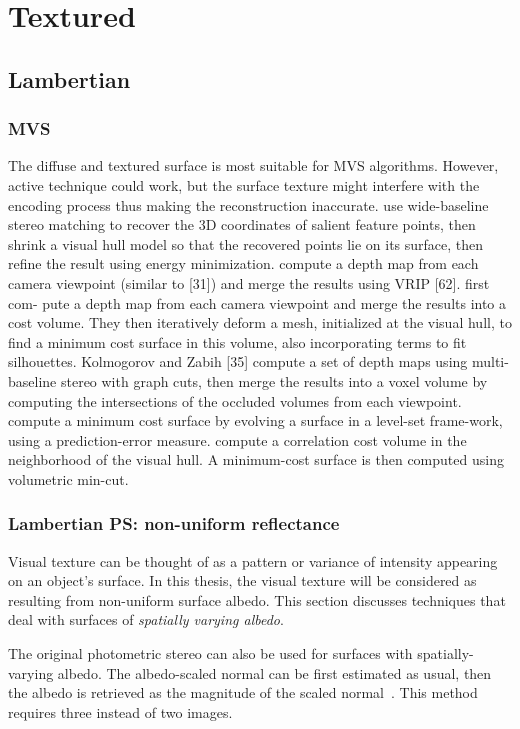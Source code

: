 \section{Textured}
\subsection{Lambertian}
\subsubsection{MVS}
The diffuse and textured surface is most suitable for MVS algorithms. However, active technique could work, but the surface texture might interfere with the encoding process thus making the reconstruction inaccurate. \citeauthor{furukawa2008high} use wide-baseline stereo matching to recover the 3D coordinates of salient feature points, then shrink a visual hull model so that the recovered points lie on its surface, then refine the result using energy minimization. \citeauthor{goesele2006multi} compute a depth map from each camera viewpoint (similar to [31]) and merge the results using VRIP [62]. \citeauthor{esteban2004silhouette} first com- pute a depth map from each camera viewpoint and merge the results into a cost volume. They then iteratively deform a mesh, initialized at the visual hull, to find a minimum cost surface in this volume, also incorporating terms to fit silhouettes. Kolmogorov and Zabih [35] compute a set of depth maps using multi-baseline stereo with graph cuts, then merge the results into a voxel volume by computing the intersections of the occluded volumes from each viewpoint. \citeauthor{faugeras2002variational} compute a minimum cost surface by evolving a surface in a level-set frame-work, using a prediction-error measure. \citeauthor{vogiatzis2007multiview} compute a correlation cost volume in the neighborhood of the visual hull. A minimum-cost surface is then computed using volumetric min-cut.

\subsubsection{Lambertian PS: non-uniform reflectance}
Visual texture can be thought of as a pattern or variance of intensity appearing on an object's surface. In this thesis, the visual texture will be considered as resulting from non-uniform surface albedo. This section discusses techniques that deal with surfaces of \textit{spatially varying albedo}.

The original photometric stereo can also be used for surfaces with spatially-varying albedo. The albedo-scaled normal can be first estimated as usual, then the albedo is retrieved as the magnitude of the scaled normal~\cite{woodham1980photometric}. This method requires three instead of two images.

